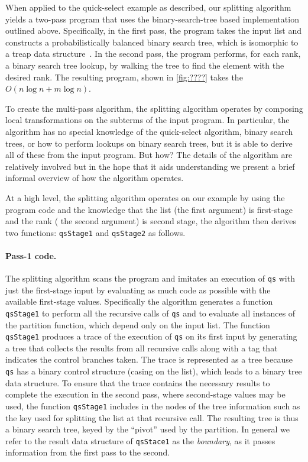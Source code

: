 \begin{abstrsyn}
When applied to the quick-select example as described, our splitting
algorithm yields a two-pass program that uses the binary-search-tree
based implementation outlined above.  Specifically, in the first pass,
the program takes the input list and constructs a probabilistically
balanced binary search tree, which is isomorphic to a treap data
structure~\cite{treaps}.  In the second pass, the program performs,
for each rank, a binary search tree lookup, by walking the tree to
find the element with the desired rank.  The resulting program, shown
in \ref{fig:????}  takes the $O(n\log{n} + m\log{n})$.

To create the multi-pass algorithm, the splitting algorithm operates
by composing local transformations on the subterms of the input
program.  In particular, the algorithm has no special knowledge of the
quick-select algorithm, binary search trees, or how to perform lookups
on binary search trees, but it is able to derive all of these from the
input program.  But how?
%
The details of the algorithm are relatively involved but in the hope
that it aids understanding we present a brief informal overview of how
the algorithm operates.  
%
%


At a high level, the splitting algorithm operates on our example by
using the program code and the knowledge that the list (the first
argument) is first-stage and the rank ( the second argument) is second
stage, the algorithm then derives two functions: \texttt{qsStage1} and
\texttt{qsStage2} as follows.


\paragraph{Pass-1 code.}
The splitting algorithm scans the program and imitates an execution of
\texttt{qs} with just the first-stage input by evaluating as much code
as possible with the available first-stage values.  Specifically the
algorithm generates a function \texttt{qsStage1} to perform all the
recursive calls of \texttt{qs} and to evaluate all instances of the
partition function, which depend only on the input list.  The function
\texttt{qsStage1} produces a trace of the execution of \texttt{qs} on
its first input by generating a tree that collects the results from
all recursive calls along with a tag that indicates the control
branches taken.  The trace is represented as a tree because
\texttt{qs} has a binary control structure (casing on the list), which
leads to a binary tree data structure.  To ensure that the trace
contains the necessary results to complete the execution in the second
pass, where second-stage values may be used, the function
\texttt{qsStage1} includes in the nodes of the tree information such
as the key used for splitting the list at that recursive call.  The
resulting tree is thus a binary search tree, keyed by the ``pivot''
used by the partition.  In general we refer to the result data
structure of \texttt{qsStace1} as the {\em boundary}, as it passes
information from the first pass to the second.


\end{abstrsyn}
